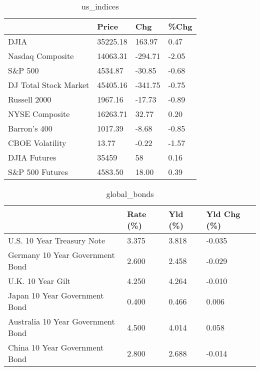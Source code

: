 \documentclass{article}%
\begin{document}
%


\begin{table}[htbp]%
\caption{us\_indices}%
\centering%
\begin{adjustbox}{width=1\textwidth}%
\begin{tabular}{llll}
\toprule
                      &    Price &     Chg &  \%Chg \\
\midrule
                 DJIA & 35225.18 &  163.97 &  0.47 \\
     Nasdaq Composite & 14063.31 & -294.71 & -2.05 \\
              S\&P 500 &  4534.87 &  -30.85 & -0.68 \\
DJ Total Stock Market & 45405.16 & -341.75 & -0.75 \\
         Russell 2000 &  1967.16 &  -17.73 & -0.89 \\
       NYSE Composite & 16263.71 &   32.77 &  0.20 \\
         Barron's 400 &  1017.39 &   -8.68 & -0.85 \\
      CBOE Volatility &    13.77 &   -0.22 & -1.57 \\
         DJIA Futures &    35459 &      58 &  0.16 \\
      S\&P 500 Futures &  4583.50 &   18.00 &  0.39 \\
\bottomrule
\end{tabular}
%
\end{adjustbox}%
\end{table}

%


\begin{table}[htbp]%
\caption{global\_bonds}%
\centering%
\begin{adjustbox}{width=1\textwidth}%
\begin{tabular}{llll}
\toprule
                                  & Rate (\%) & Yld (\%) & Yld Chg (\%) \\
\midrule
       U.S. 10 Year Treasury Note &    3.375 &   3.818 &      -0.035 \\
  Germany 10 Year Government Bond &    2.600 &   2.458 &      -0.029 \\
                U.K. 10 Year Gilt &    4.250 &   4.264 &      -0.010 \\
    Japan 10 Year Government Bond &    0.400 &   0.466 &       0.006 \\
Australia 10 Year Government Bond &    4.500 &   4.014 &       0.058 \\
    China 10 Year Government Bond &    2.800 &   2.688 &      -0.014 \\
\bottomrule
\end{tabular}
%
\end{adjustbox}%
\end{table}
\end{document}
